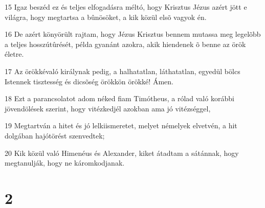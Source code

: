 \par 15 Igaz beszéd ez és teljes elfogadásra méltó, hogy Krisztus Jézus azért jött e világra, hogy megtartsa a bûnösöket, a kik közül elsõ vagyok én.
\par 16 De azért könyörült rajtam, hogy Jézus Krisztus bennem mutassa meg legelõbb a teljes hosszútûrését, példa gyanánt azokra, akik hiendenek õ benne az örök életre.
\par 17 Az örökkévaló királynak pedig, a halhatatlan, láthatatlan, egyedül bölcs Istennek tisztesség és dicsõség örökkön örökké! Ámen.
\par 18 Ezt a parancsolatot adom néked fiam Timótheus, a rólad való korábbi jövendölések szerint, hogy vitézkedjél azokban ama jó vitézséggel,
\par 19 Megtartván a hitet és jó lelkiismeretet, melyet némelyek elvetvén, a hit dolgában hajótörést szenvedtek;
\par 20 Kik közül való Himenéus és Alexander, kiket átadtam a sátánnak, hogy megtanulják, hogy ne káromkodjanak.

\chapter{2}

